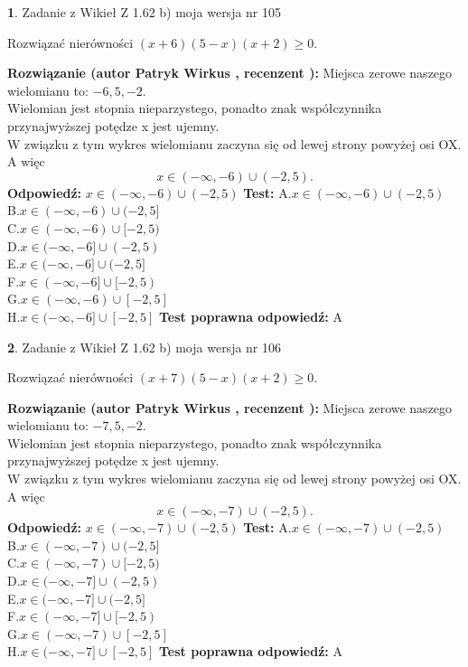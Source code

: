 \documentclass[12pt, a4paper]{article}
\theoremstyle{definition} %
\newtheorem{zad}{}
\newcommand{\zadStart}[1]{\begin{zad}#1\newline}
\newcommand{\zadStop}{\end{zad}}
\newcommand{\rozwStart}[2]{\noindent \textbf{Rozwiązanie (autor #1 , recenzent #2): }\newline}
\newcommand{\rozwStop}{\newline}
\newcommand{\odpStart}{\noindent \textbf{Odpowiedź:}\newline}
\newcommand{\odpStop}{\newline}
\newcommand{\testStart}{\noindent \textbf{Test:}\newline}
\newcommand{\testStop}{\newline}
\newcommand{\kluczStart}{\noindent \textbf{Test poprawna odpowiedź:}\newline}
\newcommand{\kluczStop}{\newline}
\begin{document}
\zadStart{Zadanie z Wikieł Z 1.62 b) moja wersja nr 105}

Rozwiązać nierówności $(x+6)(5-x)(x+2)\ge0$.
\zadStop
\rozwStart{Patryk Wirkus}{}
Miejsca zerowe naszego wielomianu to: $-6, 5, -2$.\\
Wielomian jest stopnia nieparzystego, ponadto znak współczynnika przy\linebreak najwyższej potędze x jest ujemny.\\ W związku z tym wykres wielomianu zaczyna się od lewej strony powyżej osi OX. A więc $$x \in (-\infty,-6) \cup (-2,5).$$
\rozwStop
\odpStart
$x \in (-\infty,-6) \cup (-2,5)$
\odpStop
\testStart
A.$x \in (-\infty,-6) \cup (-2,5)$\\
B.$x \in (-\infty,-6) \cup (-2,5]$\\
C.$x \in (-\infty,-6) \cup [-2,5)$\\
D.$x \in (-\infty,-6] \cup (-2,5)$\\
E.$x \in (-\infty,-6] \cup (-2,5]$\\
F.$x \in (-\infty,-6] \cup [-2,5)$\\
G.$x \in (-\infty,-6) \cup [-2,5]$\\
H.$x \in (-\infty,-6] \cup [-2,5]$
\testStop
\kluczStart
A
\kluczStop



\zadStart{Zadanie z Wikieł Z 1.62 b) moja wersja nr 106}

Rozwiązać nierówności $(x+7)(5-x)(x+2)\ge0$.
\zadStop
\rozwStart{Patryk Wirkus}{}
Miejsca zerowe naszego wielomianu to: $-7, 5, -2$.\\
Wielomian jest stopnia nieparzystego, ponadto znak współczynnika przy\linebreak najwyższej potędze x jest ujemny.\\ W związku z tym wykres wielomianu zaczyna się od lewej strony powyżej osi OX. A więc $$x \in (-\infty,-7) \cup (-2,5).$$
\rozwStop
\odpStart
$x \in (-\infty,-7) \cup (-2,5)$
\odpStop
\testStart
A.$x \in (-\infty,-7) \cup (-2,5)$\\
B.$x \in (-\infty,-7) \cup (-2,5]$\\
C.$x \in (-\infty,-7) \cup [-2,5)$\\
D.$x \in (-\infty,-7] \cup (-2,5)$\\
E.$x \in (-\infty,-7] \cup (-2,5]$\\
F.$x \in (-\infty,-7] \cup [-2,5)$\\
G.$x \in (-\infty,-7) \cup [-2,5]$\\
H.$x \in (-\infty,-7] \cup [-2,5]$
\testStop
\kluczStart
A
\kluczStop
\end{document}
